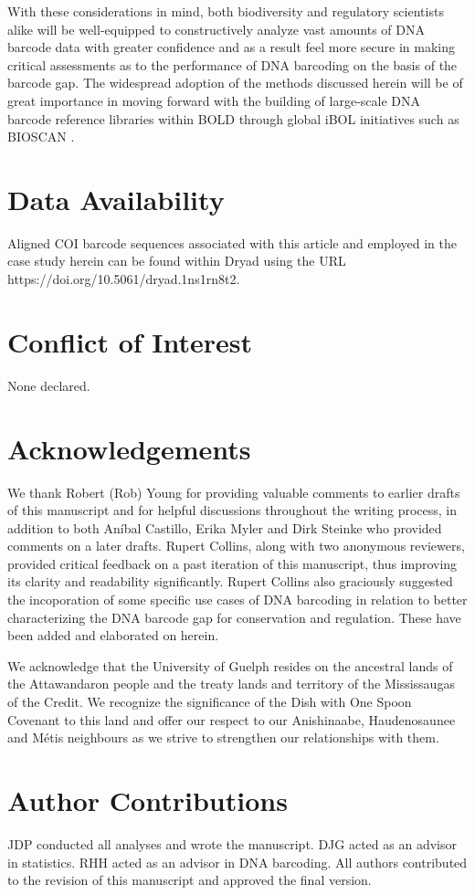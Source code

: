 With these considerations in mind, both biodiversity and regulatory scientists alike will be well-equipped to constructively analyze vast amounts of DNA barcode data with greater confidence and as a result feel more secure in making critical assessments as to the performance of DNA barcoding on the basis of the barcode gap. The widespread adoption of the methods discussed herein will be of great importance in moving forward with the building of large-scale DNA barcode reference libraries within BOLD through global iBOL initiatives such as BIOSCAN \cite{hobern2020bioscan, hobern2019bioscan}.  

\newpage

\section*{Data Availability}

Aligned COI barcode sequences associated with this article and employed in the case study herein can be found within Dryad using the URL \\ https://doi.org/10.5061/dryad.1ns1rn8t2.

\section*{Conflict of Interest}

None declared.

\section*{Acknowledgements}

We thank Robert (Rob) Young for providing valuable comments to earlier drafts of this manuscript and for helpful discussions throughout the writing process, in addition to both An{\'i}bal Castillo, Erika Myler and Dirk Steinke who provided comments on a later drafts. Rupert Collins, along with two anonymous reviewers, provided critical feedback on a past iteration of this manuscript, thus improving its clarity and readability significantly. Rupert Collins also graciously suggested the incoporation of some specific use cases of DNA barcoding in relation to better characterizing the DNA barcode gap for conservation and regulation. These have been added and elaborated on herein. 

We acknowledge that the University of Guelph resides on the ancestral lands of the Attawandaron people and the treaty lands and territory of the Mississaugas of the Credit. We recognize the significance of the Dish with One Spoon Covenant to this land and offer our respect to our Anishinaabe, Haudenosaunee and M{\'e}tis neighbours as we strive to strengthen our relationships with them.

\section*{Author Contributions}

JDP conducted all analyses and wrote the manuscript. DJG acted as an advisor in statistics. RHH acted as an advisor in DNA barcoding. All authors contributed to the revision of this manuscript and approved the final version. 

